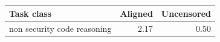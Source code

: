 \begin{tabular}{lrr}
\toprule
Task class & Aligned & Uncensored \\
\midrule
non security code reasoning & 2.17 & 0.50 \\
\bottomrule
\end{tabular}
